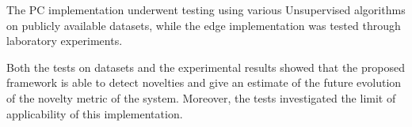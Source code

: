 The PC implementation underwent testing using various Unsupervised algorithms on publicly available datasets, while the edge implementation was tested through laboratory experiments.

Both the tests on datasets and the experimental results showed that the proposed framework is able to detect novelties and give an estimate of the future evolution of the novelty metric of the system. Moreover, the tests investigated the limit of applicability of this implementation.
